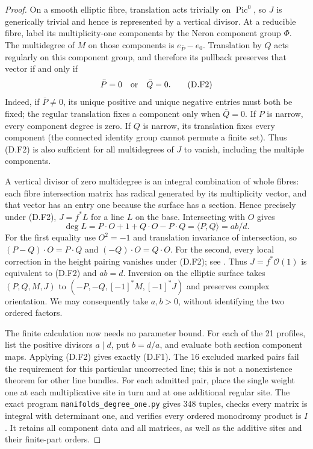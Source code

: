 \begin{proof}
On a smooth elliptic fibre, translation acts trivially
on $\operatorname{Pic}^0$, so $J$ is generically trivial
and hence is represented by a vertical divisor.
At a reducible fibre, label its multiplicity-one
components by the Neron component group $\Phi$.
The multidegree of $M$ on those components is
$e_{\bar P}-e_0$. Translation by $Q$ acts regularly
on this component group, and therefore its pullback
preserves that vector if and only if
\[
                         \bar P=0\quad\hbox{or}\quad\bar Q=0.
 \tag{D.F2}
\]
Indeed, if $\bar P\ne0$, its unique positive and unique
negative entries must both be fixed; the regular
translation fixes a component only when $\bar Q=0$.
If $P$ is narrow, every component degree is zero.
If $Q$ is narrow, its translation fixes every component
(the connected identity group cannot permute a finite
set). Thus (D.F2) is also sufficient for all multidegrees
of $J$ to vanish, including the multiple components.

A vertical divisor of zero multidegree is an integral
combination of whole fibres: each fibre intersection
matrix has radical generated by its multiplicity vector,
and that vector has an entry one because the surface has
a section. Hence precisely under (D.F2), $J=f^*L$ for
a line $L$ on the base. Intersecting with $O$ gives
\[
 \deg L=P\cdot O+1+Q\cdot O-P\cdot Q
        =\langle P,Q\rangle=ab/d.
\]
For the first equality use $O^2=-1$ and translation
invariance of intersection, so
$(P-Q)\cdot O=P\cdot Q$ and $(-Q)\cdot O=Q\cdot O$.
For the second, every local correction in the height
pairing vanishes under (D.F2); see
\cite[Section 11.8]{manSS10}.
Thus $J=f^*\mathcal O(1)$ is equivalent to (D.F2) and
$ab=d$. Inversion on the elliptic surface takes
$(P,Q,M,J)$ to $(-P,-Q,[-1]^*M,[-1]^*J)$ and preserves
complex orientation. We may consequently take $a,b>0$,
without identifying the two ordered factors.

The finite calculation now needs no parameter bound.
For each of the 21 profiles, list the positive divisors
$a\mid d$, put $b=d/a$, and evaluate both section
component maps. Applying (D.F2) gives exactly (D.F1).
The 16 excluded marked pairs fail the requirement for
this particular uncorrected line; this is not a
nonexistence theorem for other line bundles.
For each admitted pair, place the single weight one
at each multiplicative site in turn and at one
additional regular site. The exact program
\texttt{manifolds\_degree\_one.py} gives 348 tuples,
checks every matrix is integral with determinant one,
and verifies every ordered monodromy product is $I$.
It retains all component data and all matrices, as well
as the additive sites and their finite-part orders.


\end{proof}
